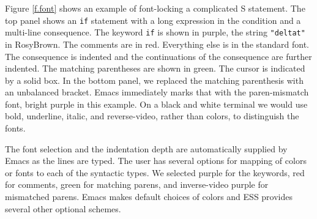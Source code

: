 \documentclass{article}
\newcommand{\stexttt}[1]{{\small\texttt{#1}}}
\begin{document}
Figure \ref{f.font} shows an example of font-locking a complicated S
statement.  The top panel shows an \stexttt{if} statement with a long
expression in the condition and a multi-line consequence.  The keyword
\stexttt{if} is shown in purple, the string \stexttt{"deltat"} in
RosyBrown.  The comments are in red.  Everything else is in the
standard font.  The consequence is indented and the continuations of
the consequence are further indented.  The matching parentheses are
shown in green.  The cursor is indicated by a solid box.  In the
bottom panel, we replaced the matching parenthesis with an unbalanced
bracket.  Emacs immediately marks that with the paren-mismatch font,
bright purple in this example.  On a black and white terminal we would
use bold, underline, italic, and reverse-video, rather than colors, to
distinguish the fonts.


The font selection and the indentation depth are automatically
supplied by Emacs as the lines are typed.  The user has several
options for mapping of colors or fonts to each of the syntactic types.
We selected
purple for the keywords, red for comments, green for matching parens,
and inverse-video purple for mismatched parens.  Emacs makes default
choices of colors and ESS provides several other optional schemes.
\end{document}
